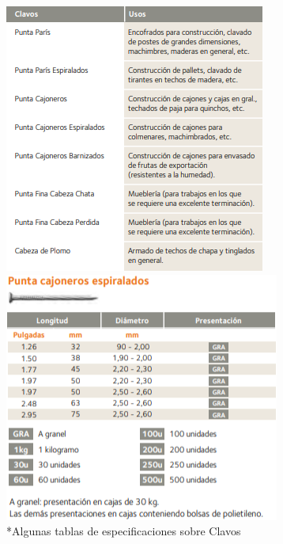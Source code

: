 \documentclass[12pt,a4paper]{article}
\begin{document}
\begin{figure}[H]
    \centering
    \begin{minipage}{0.45\textwidth}
        \centering
        \includegraphics[width=\textwidth]{Inagenes para latex/15 izq.png}
    \end{minipage}
    \begin{minipage}{0.45\textwidth}
        \centering
        \includegraphics[width=\textwidth]{Inagenes para latex/15 der.png}
    \end{minipage}
    \caption*{*Algunas tablas de especificaciones sobre Clavos}
\end{figure}
\end{document}
